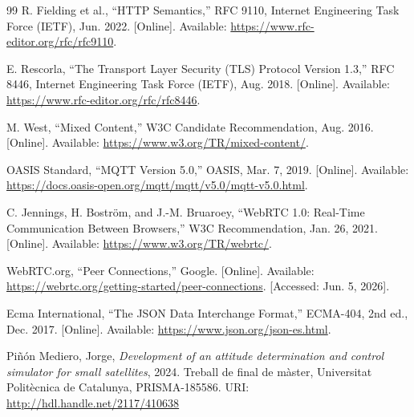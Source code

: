 \documentclass[spanish,final]{setup/eetac_tfc_pfc}
\begin{document}
\begin{thebibliography}{99}
R. Fielding et al., ``HTTP Semantics,''
RFC 9110, Internet Engineering Task Force (IETF), Jun. 2022. [Online].
Available: \url{https://www.rfc-editor.org/rfc/rfc9110}.

E. Rescorla, ``The Transport Layer Security (TLS) Protocol Version 1.3,''
RFC 8446, Internet Engineering Task Force (IETF), Aug. 2018. [Online].
Available: \url{https://www.rfc-editor.org/rfc/rfc8446}.

M. West, ``Mixed Content,''
W3C Candidate Recommendation, Aug. 2016. [Online].
Available: \url{https://www.w3.org/TR/mixed-content/}.

OASIS Standard, ``MQTT Version 5.0,''
OASIS, Mar. 7, 2019. [Online].
Available: \url{https://docs.oasis-open.org/mqtt/mqtt/v5.0/mqtt-v5.0.html}.

C. Jennings, H. Boström, and J.-M. Bruaroey, ``WebRTC 1.0:
Real-Time Communication Between Browsers,''
W3C Recommendation, Jan. 26, 2021. [Online].
Available: \url{https://www.w3.org/TR/webrtc/}.

WebRTC.org, ``Peer Connections,''
Google. [Online].
Available: \url{https://webrtc.org/getting-started/peer-connections}.
[Accessed: Jun. 5, 2026].

Ecma International, ``The JSON Data Interchange Format,''
ECMA-404, 2nd ed., Dec. 2017. [Online].
Available: \url{https://www.json.org/json-es.html}.








Piñón Mediero, Jorge,
\textit{Development of an attitude determination and control simulator for small satellites},
2024.
Treball de final de màster, Universitat Politècnica de Catalunya,
PRISMA-185586. URI: \url{http://hdl.handle.net/2117/410638}

\end{thebibliography}


\pagestyle{empty}  %

\appendix\senseportada
\end{document}
